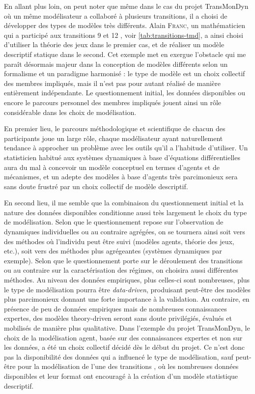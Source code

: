 En allant plus loin, on peut noter que même dans le cas du projet TransMonDyn où un même modélisateur a collaboré à plusieurs transitions, il a choisi de développer des types de modèles très différents.
Alain \textsc{Franc}, un mathématicien qui a participé aux transitions 9 \autocite{ouriachi_transition_2017} et 12 \autocite{bretagnolle_transition_2017}, voir \cref{tab:transitions-tmd}, a ainsi choisi d'utiliser la théorie des jeux dans le premier cas, et de réaliser un modèle descriptif statique dans le second.
Cet exemple met en exergue l'obstacle qui me paraît désormais majeur dans la conception de modèles différents selon un formalisme et un paradigme harmonisé : le type de modèle est un choix collectif des membres impliqués, mais il n'est pas pour autant réalisé de manière entièrement indépendante.
Le questionnement initial, les données disponibles ou encore le parcours personnel des membres impliqués jouent ainsi un rôle considérable dans les choix de modélisation.

En premier lieu, le parcours méthodologique et scientifique de chacun des participants joue un large rôle, chaque modélisateur ayant naturellement tendance à approcher un problème avec les outils qu'il a l'habitude d'utiliser.
Un statisticien habitué aux systèmes dynamiques à base d'équations différentielles aura du mal à concevoir un modèle conceptuel en termes d'agents et de mécanismes, et un adepte des modèles à base d'agents très parcimonieux sera sans doute frustré par un choix collectif de modèle descriptif.

En second lieu, il me semble que la combinaison du questionnement initial et la nature des données disponibles conditionne aussi très largement le choix du type de modélisation.
Selon que le questionnement repose sur l'observation de dynamiques individuelles ou au contraire agrégées, on se tournera ainsi soit vers des méthodes où l'individu peut être suivi (modèles agents, théorie des jeux, etc.), soit vers des méthodes plus agrégeantes (systèmes dynamiques par exemple).
Selon que le questionnement porte sur le déroulement des \og transitions\fg{} ou au contraire sur la caractérisation des \og régimes\fg{}, on choisira aussi différentes méthodes.
Au niveau des données empiriques, plus celles-ci sont nombreuses, plus le type de modélisation pourra être \og \textit{data-driven}\fg, produisant peut-être des modèles plus parcimonieux donnant une forte importance à la validation.
Au contraire, en présence de peu de données empiriques mais de nombreuses connaissances expertes, des modèles \og theory-driven\fg{} seront sans doute privilégiés, évalués et mobilisés de manière plus qualitative.
Dans l'exemple du projet TransMonDyn, le choix de la modélisation agent, basée sur des connaissances expertes et non sur les données, a été un choix collectif décidé dès le début du projet.
Ce n'est donc pas la disponibilité des données qui a influencé le type de modélisation, sauf peut-être pour la modélisation de l'une des transitions \autocite{bretagnolle_transition_2017}, où les nombreuses données disponibles et leur format ont encouragé à la création d'un modèle statistique descriptif.


